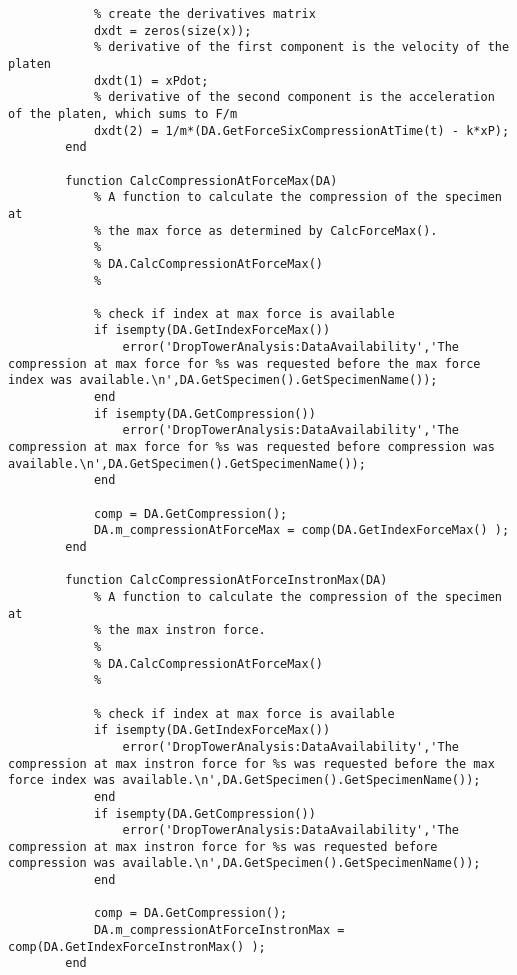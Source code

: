 \begin{lstlisting}
            % create the derivatives matrix
            dxdt = zeros(size(x));
            % derivative of the first component is the velocity of the platen
            dxdt(1) = xPdot;
            % derivative of the second component is the acceleration of the platen, which sums to F/m
            dxdt(2) = 1/m*(DA.GetForceSixCompressionAtTime(t) - k*xP);
        end
        
        function CalcCompressionAtForceMax(DA)
            % A function to calculate the compression of the specimen at
            % the max force as determined by CalcForceMax().
            %
            % DA.CalcCompressionAtForceMax()
            %
            
            % check if index at max force is available
            if isempty(DA.GetIndexForceMax())
                error('DropTowerAnalysis:DataAvailability','The compression at max force for %s was requested before the max force index was available.\n',DA.GetSpecimen().GetSpecimenName());
            end
            if isempty(DA.GetCompression())
                error('DropTowerAnalysis:DataAvailability','The compression at max force for %s was requested before compression was available.\n',DA.GetSpecimen().GetSpecimenName());
            end
            
            comp = DA.GetCompression();
            DA.m_compressionAtForceMax = comp(DA.GetIndexForceMax() );
        end
        
        function CalcCompressionAtForceInstronMax(DA)
            % A function to calculate the compression of the specimen at
            % the max instron force.
            %
            % DA.CalcCompressionAtForceMax()
            %
            
            % check if index at max force is available
            if isempty(DA.GetIndexForceMax())
                error('DropTowerAnalysis:DataAvailability','The compression at max instron force for %s was requested before the max force index was available.\n',DA.GetSpecimen().GetSpecimenName());
            end
            if isempty(DA.GetCompression())
                error('DropTowerAnalysis:DataAvailability','The compression at max instron force for %s was requested before compression was available.\n',DA.GetSpecimen().GetSpecimenName());
            end
            
            comp = DA.GetCompression();
            DA.m_compressionAtForceInstronMax = comp(DA.GetIndexForceInstronMax() );
        end
        

\end{lstlisting}
